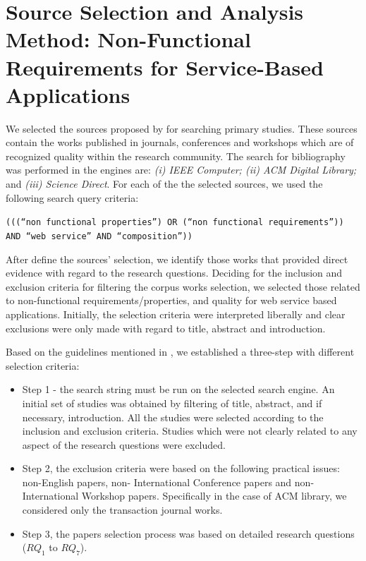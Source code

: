 \appendix



\chapter{Source Selection and Analysis Method: Non-Functional Requirements for
Service-Based Applications}
\label{append:analysis}


We selected the sources proposed by \cite{Kitchenham08} for searching primary
studies. These sources contain the works published in journals, conferences and
workshops which are of recognized quality within the research community. The
search for bibliography was performed in the engines are: \textit{(i) IEEE
Computer; (ii) ACM Digital Library;} and \textit{(iii) Science Direct}. For each
of the the selected sources, we used the following search query criteria:

\begin{center}
\texttt{(((``non functional properties'') OR (``non functional requirements''))
AND ``web service'' AND ``composition''))}
\end{center}

   
After define the sources' selection, we identify those works that provided direct
evidence with regard to the research questions. Deciding
for the inclusion and exclusion criteria for filtering the corpus works
selection, we selected those related to non-functional requirements/properties,
and quality for web service based applications. Initially, the selection
criteria were interpreted liberally and clear exclusions were only made with
regard to title, abstract and introduction.

Based on the guidelines mentioned in \cite{Kitchenham08}, we established a
three-step with different selection criteria:

\begin{itemize}
\item Step 1 - the search string must be run on the selected
search engine. An initial set of studies was obtained by filtering
of title, abstract, and if necessary, introduction. All the studies were
selected according to the inclusion and exclusion criteria. Studies which
were not clearly related to any aspect of the research questions
were excluded.
\item Step 2, the exclusion criteria were based on the following
practical issues: non-English papers, non-
International Conference papers and non-International Workshop
papers. Specifically in the case of ACM library, we considered only the
transaction journal works.
\item Step 3, the papers selection process was based on detailed
research questions ($RQ_1$ to $RQ_7$).
\end{itemize}

